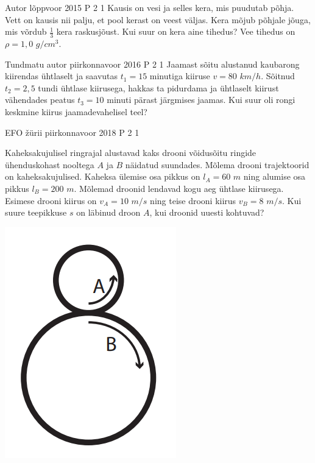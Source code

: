 \documentclass[11pt]{article}
\begin{document}
{%
{Autor} %
{lõppvoor} %
{2015} %
{P 2} %
{1} %
{
\ifStatement
 Kausis on vesi ja selles kera, mis puudutab põhja. Vett on kausis nii palju, et pool kerast on veest väljas. Kera mõjub põhjale jõuga, mis võrdub $\frac{1}{3}$ kera raskusjõust. Kui suur on kera aine tihedus? Vee tihedus on $\rho = 1,0$ $g/cm^3$.
\fi
}

{Tundmatu autor} %
{piirkonnavoor} %
{2016} %
{P 2} %
{1} %
{
\ifStatement
Jaamast sõitu alustanud kaubarong kiirendas ühtlaselt ja saavutas $t_1=15$ minutiga kiiruse $v=80$ $km/h$. Sõitnud $t_2 = 2,5$ tundi ühtlase kiirusega, hakkas ta pidurdama ja ühtlaselt kiirust vähendades peatus $t_3=10$ minuti pärast järgmises jaamas. Kui suur oli rongi keskmine kiirus jaamadevahelisel teel?
\fi
}

{EFO žürii} %
{piirkonnavoor} %
{2018} %
{P 2} %
{1} %
{
\ifStatement
 Kaheksakujulisel ringrajal alustavad kaks drooni võidusõitu ringide ühenduskohast nooltega $A$ ja $B$ näidatud suundades. Mõlema drooni trajektoorid on kaheksakujulised. Kaheksa ülemise osa pikkus on $l_A = 60$ $m$ ning alumise osa pikkus $l_B = 200$ $m$. Mõlemad droonid lendavad kogu aeg ühtlase kiirusega. Esimese drooni kiirus on $v_A = 10$ $m/s$ ning teise drooni kiirus $v_B = 8$ $m/s$. Kui suure teepikkuse $s$ on läbinud droon $A$, kui droonid uuesti kohtuvad? 
\begin{center}
	\includegraphics[width=0.5\linewidth]{2018-v2p-02-yl.PNG}
\end{center}
\fi
}


}
\end{document}
